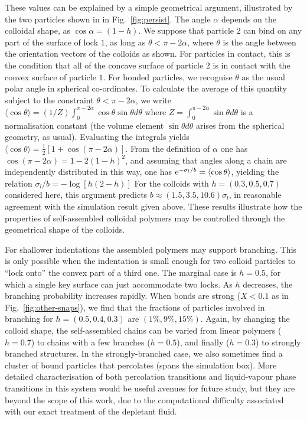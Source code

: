 \documentclass[8.5pt,oneside,onecolumn]{article}
\begin{document}
\vspace{6pt}

These values can be explained by 
a simple geometrical argument, illustrated by the two particles shown in
in Fig.~\ref{fig:persist}.  The angle $\alpha$ depends on the colloidal shape, as $\cos\alpha = (1-h)$.
 We suppose that particle $2$ can bind on any part of the surface of 
lock $1$, as long as $\theta < \pi-2\alpha$, where $\theta$ is the angle between the orientation vectors 
of the colloids as shown.  For particles in contact, this is the condition that all of the concave
surface of particle $2$ is in contact with the convex surface of particle $1$.
%
For bonded particles, we recognise $\theta$ as the usual polar angle
in spherical co-ordinates.  To calculate the average of this quantity
subject to the constraint $\theta<\pi-2\alpha$, we write
  $\langle \cos \theta \rangle = (1/Z) \int_0^{\pi-2\alpha} \cos\theta \sin\theta d\theta$
where 
  $Z = \int_0^{\pi-2\alpha} \sin\theta d\theta$ is a normalisation constant
(the volume element $\sin\theta d\theta$ arises from the spherical geometry, as usual).  
Evaluating the integrals yields $\langle\cos\theta\rangle = \frac12[1+\cos(\pi - 2\alpha)]$.
%
From the definition of $\alpha$ one has $\cos(\pi-2\alpha) = 1-2(1-h)^2$, and assuming that angles 
along a chain are independently distributed in this way,
one has ${\rm e}^{-\sigma_l/b} = \langle \cos\theta \rangle $, yielding the relation $\sigma_l/b = -\log[h(2-h)]$
For the colloids with
$h=(0.3,0.5,0.7)$ considered here, this argument predicts $b\approx(1.5,3.5,10.6)\sigma_l$, 
in reasonable agreement with the simulation result given above.
These results illustrate how the
properties of self-assembled colloidal polymers may be controlled
through the geometrical shape of the colloids.

For shallower indentations the assembled polymers may support
branching.  This is only possible when the indentation is 
small enough for two colloid particles to
``lock
onto'' the convex part of a third one.  The marginal case is
$h=0.5$, for which a single key surface can just accommodate
two locks.  As $h$ decreases, the branching probability increases
rapidly.  When bonds are strong ($X<0.1$ as in
Fig.~\ref{fig:other-snaps}), we find that the fractions of particles
involved in branching for $h=(0.5,0.4,0.3)$ are $(1\%, 9\%,15\%)$.
Again, by changing the colloid shape, the self-assembled chains can be
varied from linear polymers ($h=0.7$) to chains with a few
branches ($h=0.5$), and finally ($h=0.3$) to strongly
branched structures.  In the strongly-branched case, we also sometimes find a cluster of bound particles that 
percolates (spans the simulation box).  More detailed characterisation of both percolation
transitions and liquid-vapour phase transitions in this system would be useful avenues for
future study, but they are beyond the scope of this work, due to the computational difficulty
associated with our exact treatment of the depletant fluid.
\end{document}
